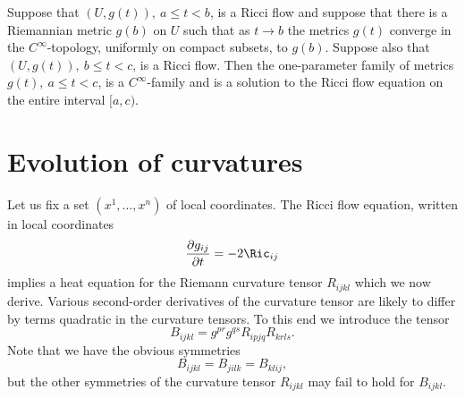 \begin{proposition}
\label{patch}

 Suppose that $(U,g(t)),\ a\le t<b$, is a Ricci flow and suppose that
 there is a Riemannian metric $g(b)$ on $U$ such that
 as $t\rightarrow b$ the metrics $g(t)$ converge in the $C^\infty$-topology, uniformly
 on compact subsets, to $g(b)$. Suppose also that $(U,g(t)),\ b\le t<c$, is a
 Ricci flow. Then the one-parameter family of metrics $g(t), \ a\le
 t<c$, is a $C^\infty$-family and is a solution to the Ricci flow
 equation on the entire interval $[a,c)$.
 \end{proposition}


\section{Evolution of curvatures}\label{evolcurv}


Let us fix a set
$(x^1,\ldots,x^n)$ of local coordinates. The Ricci flow equation,
written in local coordinates
\[ \frac{\partial g_{ij}}{\partial t} =
-2\Ric_{ij}
\]  implies a heat equation for the Riemann
curvature tensor $R_{ijkl}$ which we now derive. Various second-order
derivatives of the curvature tensor are likely to differ by
terms quadratic in the curvature tensors. To this end we introduce
the tensor $$B_{ijkl} = g^{pr}g^{qs}R_{ipjq}R_{krls}.$$ Note that we
have the obvious symmetries
$$B_{ijkl} = B_{jilk} = B_{klij},$$ but the other symmetries of
the curvature tensor $R_{ijkl}$ may fail to hold for $B_{ijkl}$.

\smallskip

